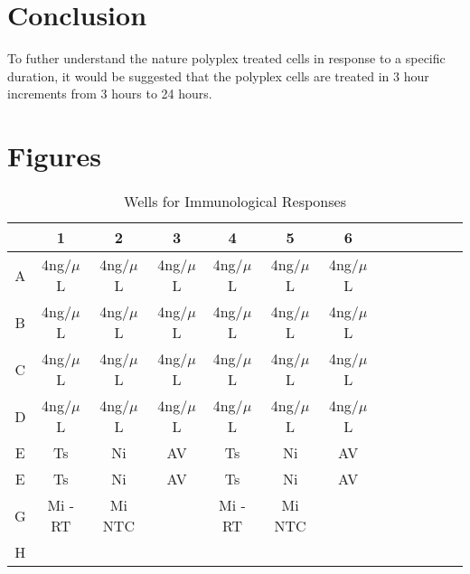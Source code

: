 \documentclass[journal, a4paper]{IEEEtran}
\begin{document}
\section{Conclusion}

To futher understand the nature polyplex treated cells in response to a specific duration,
it would be suggested that the polyplex cells are treated in 3 hour increments from 3 hours to 24 hours.


\section{Figures}

  \begin{table}[!hbt]
    \begin{center}
    \caption{Wells for Immunological Responses}
    \label{tab:simParameters}
    \begin{tabular}{|c|c|c|c|c|c|c|c|c|c|c|c|c|}
      \hline
      & 1 & 2 & 3 & 4 & 5 & 6\\
      \hline
      A & 4ng/$\mu$L & 4ng/$\mu$L & 4ng/$\mu$L & 4ng/$\mu$L & 4ng/$\mu$L & 4ng/$\mu$L\\
      \hline
      B & 4ng/$\mu$L & 4ng/$\mu$L & 4ng/$\mu$L & 4ng/$\mu$L & 4ng/$\mu$L & 4ng/$\mu$L\\
      \hline
      C & 4ng/$\mu$L & 4ng/$\mu$L & 4ng/$\mu$L & 4ng/$\mu$L & 4ng/$\mu$L & 4ng/$\mu$L\\
      \hline
      D & 4ng/$\mu$L & 4ng/$\mu$L & 4ng/$\mu$L & 4ng/$\mu$L & 4ng/$\mu$L & 4ng/$\mu$L\\
      \hline
      E & Ts & Ni & AV & Ts & Ni & AV\\
      \hline
      E & Ts & Ni & AV & Ts & Ni & AV\\
      \hline
      G & Mi -RT & Mi NTC & & Mi -RT & Mi NTC & \\
      \hline
      H & & & & & &\\
      \hline
    \end{tabular}
    \end{center}
  \end{table}
\end{document}
